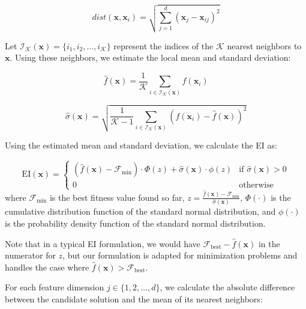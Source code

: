 \documentclass[review]{elsarticle}
\begin{document}
\begin{equation}
dist(\boldsymbol{x}, \boldsymbol{x}_i) = \sqrt{\sum_{j=1}^d (\boldsymbol{x}_j - \boldsymbol{x}_{ij})^2}
\end{equation}

Let $\mathcal{I}_\mathcal{K}(\boldsymbol{x}) = \{i_1, i_2, \ldots, i_\mathcal{K}\}$ represent the indices of the $\mathcal{K}$ nearest neighbors to $\boldsymbol{x}$. Using these neighbors, we estimate the local mean and standard deviation:

\begin{equation}
\hat{f}(\boldsymbol{x}) = \frac{1}{\mathcal{K}} \sum_{i \in \mathcal{I}_\mathcal{K}(\boldsymbol{x})} f(\boldsymbol{x}_i)
\end{equation}

\begin{equation}
\hat{\sigma}(\boldsymbol{x}) = \sqrt{\frac{1}{\mathcal{K}-1} \sum_{i \in \mathcal{I}_\mathcal{K}(\boldsymbol{x})} (f(\boldsymbol{x}_i) - \hat{f}(\boldsymbol{x}))^2}
\end{equation}

Using the estimated mean and standard deviation, we calculate the EI as:

\begin{equation}
\text{EI}(\boldsymbol{x}) = 
\begin{cases}
(\hat{f}(\boldsymbol{x}) - \mathcal{F}_\text{min}) \cdot \Phi(z) + \hat{\sigma}(\boldsymbol{x}) \cdot \phi(z) & \text{if } \hat{\sigma}(\boldsymbol{x}) > 0 \\
0 & \text{otherwise}
\end{cases}
\end{equation}
where $\mathcal{F}_\text{min}$ is the best fitness value found so far, $z = \frac{\hat{f}(\boldsymbol{x}) - \mathcal{F}_\text{min}}{\hat{\sigma}(\boldsymbol{x})}$, $\Phi(\cdot)$ is the cumulative distribution function of the standard normal distribution, and $\phi(\cdot)$ is the probability density function of the standard normal distribution.

Note that in a typical EI formulation, we would have $\mathcal{F}_\text{best} - \hat{f}(\boldsymbol{x})$ in the numerator for $z$, but our formulation is adapted for minimization problems and handles the case where $\hat{f}(\boldsymbol{x}) > \mathcal{F}_\text{best}$.

For each feature dimension $j \in \{1, 2, \ldots, d\}$, we calculate the absolute difference between the candidate solution and the mean of its nearest neighbors:
\end{document}
